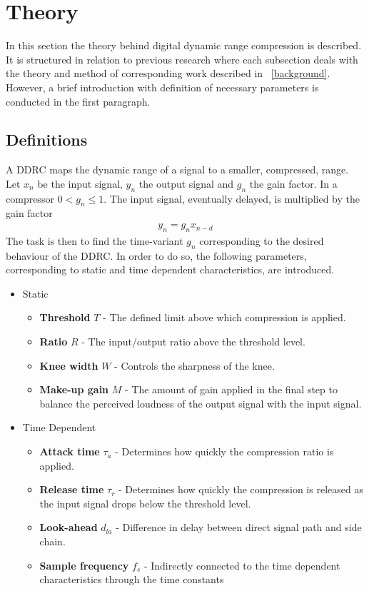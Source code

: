 \documentclass[../main2.tex]{subfiles}
\begin{document}
\section{Theory}\label{sec_theory}
In this section the theory behind digital dynamic range compression is described. It is structured in relation to previous research where each subsection deals with the theory and method of corresponding work described in ~\ref{background}. However, a brief introduction with definition of necessary parameters is conducted in the first paragraph. 

\subsection{Definitions} \label{theory_definitions}
A DDRC maps the dynamic range of a signal to a smaller, compressed, range. Let $x_n$ be the input signal, $y_n$ the output signal and $g_n$ the gain factor. In a compressor $0<g_n\leq 1$. The input signal, eventually delayed, is multiplied by the gain factor
\begin{align}
y_n = g_nx_{n-d}
\label{eq:gainfactor}
\end{align}
The task is then to find the time-variant $g_n$ corresponding to the desired behaviour of the DDRC. In order to do so, the following parameters, corresponding to static and time dependent characteristics, are introduced.
\begin{itemize}
\item{Static}
	\begin{itemize}
	\item \textbf{Threshold} $T$ - The defined limit above which compression is applied.
	\item \textbf{Ratio} $R$ - The input/output ratio above the threshold level.
	\item \textbf{Knee width}  $W$ - Controls the sharpness of the knee.
	\item \textbf{Make-up gain}  $M$ - The amount of gain applied in the final step to balance the perceived loudness of the output signal with the input signal.
\end{itemize}
\item{Time Dependent}
	\begin{itemize}
	\item \textbf{Attack time} $\tau_{a}$ - Determines how quickly the compression ratio is applied.
	\item \textbf{Release time} $\tau_{r}$ - Determines how quickly the compression is released as the input signal drops below the threshold level.
	\item \textbf{Look-ahead} $d_{la}$ - Difference in delay between direct signal path and side chain. 
	\item \textbf{Sample frequency} $f_{s}$ - Indirectly connected to the time dependent characteristics through the time constants
	\end{itemize}
\end{itemize}
\end{document}
